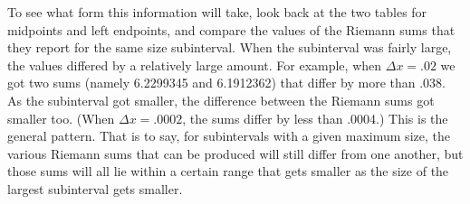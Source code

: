 To see what form this information will take, look back at the two
tables for midpoints and left endpoints, and compare the values of the
Riemann sums that they report for the same size subinterval.  When the
subinterval was fairly large, the values differed by a relatively
large amount.  For example, when $\Delta x = .02$ we got two sums
(namely 6.2299345 and 6.1912362) that differ by more than .038.  As
the subinterval got smaller, the difference between the Riemann sums
got smaller too.  (When $\Delta x = .0002$, the sums differ by less
than .0004.)  This is the general pattern.  That is to say, for
subintervals with a given maximum size, the various Riemann sums that
can be produced will still differ from one another, but those sums
will all lie within a certain range that gets smaller as the size of
the largest subinterval gets smaller.


